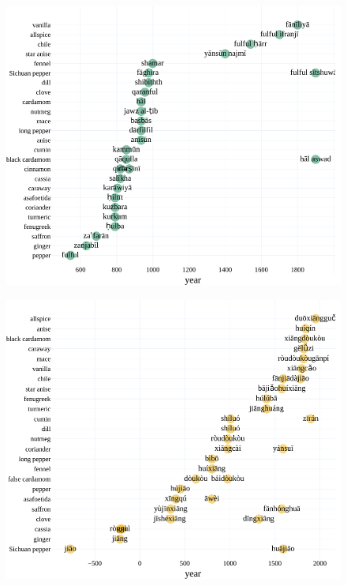\begin{figure}[!ht]
  \centering
  \includegraphics[width=\linewidth]{imgs/plots/attestation_ar.pdf}
  \caption{}
  \label{fig:attestation_ar}
\end{figure}

\begin{figure}[!ht]
  \centering
  \includegraphics[width=\linewidth]{imgs/plots/attestation_zh.pdf}
  \caption{}
  \label{fig:attestation_zh}
\end{figure}

